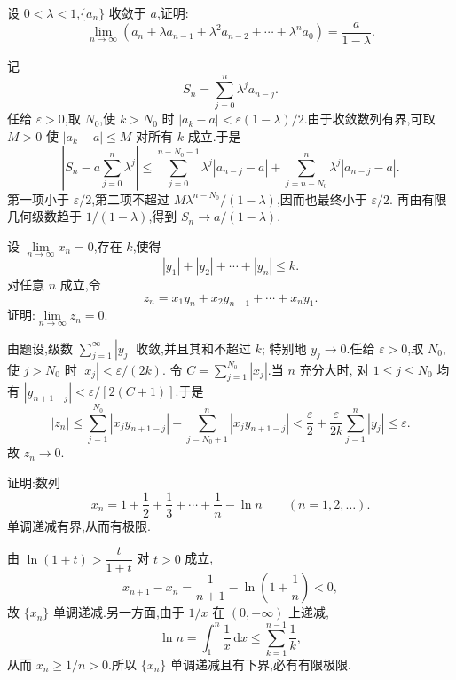 \begin{example}
  设 $0<\lambda<1$,$\{a_n\}$ 收敛于 $a$,证明:
  \[
    \lim\limits_{n\to\infty}
    \left(a_n+\lambda a_{n-1}+\lambda^2a_{n-2}+\cdots+\lambda^n a_0\right)
    =\dfrac{a}{1-\lambda}.
  \]
\end{example}
\exampleblank

\begin{solution}
  记
  \[
    S_n=\sum\limits_{j=0}^n\lambda^j a_{n-j}.
  \]
  任给 $\varepsilon>0$,取 $N_0$,使 $k>N_0$ 时
  $|a_k-a|<\varepsilon(1-\lambda)/2$.由于收敛数列有界,可取 $M>0$ 使
  $|a_k-a|\leq M$ 对所有 $k$ 成立.于是
  \[
    \left|S_n-a\sum\limits_{j=0}^n\lambda^j\right|
    \leq \sum\limits_{j=0}^{n-N_0-1}\lambda^j|a_{n-j}-a|
    +\sum\limits_{j=n-N_0}^{n}\lambda^j|a_{n-j}-a|.
  \]
  第一项小于 $\varepsilon/2$,第二项不超过
  $M\lambda^{n-N_0}/(1-\lambda)$,因而也最终小于 $\varepsilon/2$.
  再由有限几何级数趋于 $1/(1-\lambda)$,得到
  $S_n\to a/(1-\lambda)$.
\end{solution}

\begin{example}
  设 $\displaystyle \lim\limits_{n\to\infty}x_n=0$,存在 $k$,使得
  \[
    |y_1|+|y_2|+\cdots+|y_n|\leq k.
  \]
  对任意 $n$ 成立,令
  \[
    z_n=x_1y_n+x_2y_{n-1}+\cdots+x_ny_1.
  \]
  证明:$\displaystyle \lim\limits_{n\to\infty}z_n=0$.
\end{example}
\exampleblank

\begin{solution}
  由题设,级数 $\displaystyle \sum\limits_{j=1}^{\infty}|y_j|$ 收敛,并且其和不超过 $k$;
  特别地 $y_j\to0$.任给 $\varepsilon>0$,取 $N_0$,使
  $j>N_0$ 时 $|x_j|<\varepsilon/(2k)$.
  令 $C=\displaystyle \sum\limits_{j=1}^{N_0}|x_j|$.当 $n$ 充分大时,
  对 $1\leq j\leq N_0$ 均有
  $|y_{n+1-j}|<\varepsilon/[2(C+1)]$.于是
  \[
    |z_n|
    \leq\sum\limits_{j=1}^{N_0}|x_jy_{n+1-j}|
    +\sum\limits_{j=N_0+1}^{n}|x_jy_{n+1-j}|
    <\dfrac{\varepsilon}{2}
    +\dfrac{\varepsilon}{2k}\sum\limits_{j=1}^{n}|y_j|
    \leq\varepsilon.
  \]
  故 $z_n\to0$.
\end{solution}




\begin{example}
  证明:数列
  \[
    x_n=1+\dfrac{1}{2}+\dfrac{1}{3}+\cdots+\dfrac{1}{n}-\ln n
    \qquad(n=1,2,\ldots).
  \]
  单调递减有界,从而有极限.
\end{example}
\exampleblank

\begin{solution}
  由 $\ln(1+t)>\dfrac{t}{1+t}$ 对 $t>0$ 成立,
  \[
    x_{n+1}-x_n
    =\dfrac{1}{n+1}-\ln\left(1+\dfrac{1}{n}\right)<0,
  \]
  故 $\{x_n\}$ 单调递减.另一方面,由于 $1/x$ 在 $(0,+\infty)$ 上递减,
  \[
    \ln n=\int_1^n\dfrac{1}{x}\,\mathrm{d}x
    \leq\sum\limits_{k=1}^{n-1}\dfrac{1}{k},
  \]
  从而 $x_n\geq1/n>0$.所以 $\{x_n\}$ 单调递减且有下界,必有有限极限.
\end{solution}

